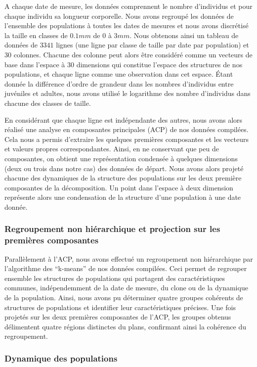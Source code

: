 A chaque date de mesure, les données comprennent le nombre d'individus et pour
chaque individu sa longueur corporelle. Nous avons regroupé les données de
l'ensemble des populations à toutes les dates de mesures et nous avons
discrétisé la taille en classes de $0.1mm$ de $0$ à $3mm$. Nous obtenons ainsi
un tableau de données de $3341$ lignes (une ligne par classe de taille par date
par population) et $30$ colonnes. Chacune des colonne peut alors être considéré
comme un vecteurs de base dans l'espace à $30$ dimensions qui constitue l'espace
des structures de nos populations, et chaque ligne comme une observation dans
cet espace. Étant donnée la différence d'ordre de grandeur dans les nombres
d'individus entre juvéniles et adultes, nous avons utilisé le logarithme des
nombre d'individus dans chacune des classes de taille.

En considérant que chaque ligne est indépendante des autres, nous avons alors
réalisé une analyse en composantes principales (ACP) de nos données compilées.
Cela nous a permis d'extraire les quelques premières composantes et les vecteurs
et valeurs propres correspondantes. Ainsi, en ne conservant que peu de
composantes, on obtient une représentation condensée à quelques dimensions
(deux ou trois dans notre cas) des données de départ. Nous avons alors projeté
chacune des dynamiques de la structure des populations sur les deux première
composantes de la décomposition. Un point dans l'espace à deux dimension
représente alors une condensation de la structure d'une population à une date
donnée. 

\subsubsection{Regroupement non hiérarchique et projection sur les premières
composantes}

Parallèlement à l'ACP, nous avons effectué un regroupement non hiérarchique par
l'algorithme des ``k-means'' de nos données compilées. Ceci permet de regrouper
ensemble les structures de populations qui partagent des caractéristiques
communes, indépendemment de la date de mesure, du clone ou de la dynamique de la
population. Ainsi, nous avons pu déterminer quatre groupes cohérents de
structures de populations et identifier leur caractéristiques précises. Une fois
projetés sur les deux premières composantes de l'ACP, les groupes obtenus
délimentent quatre régions distinctes du plans, confirmant ainsi la cohérence du
regroupement. 
 
\subsubsection{Dynamique des populations}

